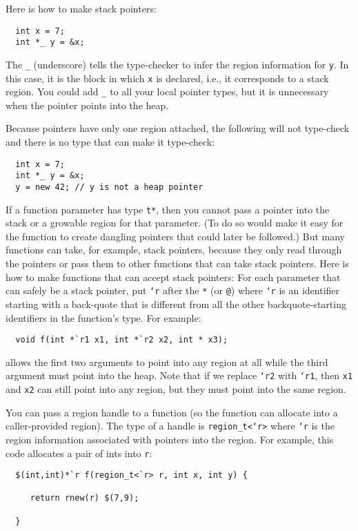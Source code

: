Here is how to make stack pointers:

\begin{verbatim}
  int x = 7;
  int *_ y = &x;
\end{verbatim}

The \texttt{_} (underscore) tells the type-checker to infer the region
information for \texttt{y}.  In this case, it is the block in which
\texttt{x} is declared, i.e., it corresponds to a stack region.  You
could add \texttt{_} to all your local pointer types, but it is
unnecessary when the pointer points into the heap.

Because pointers have only one region attached, the following will not
type-check and there is no type that can make it type-check:
\begin{verbatim}
  int x = 7;
  int *_ y = &x;
  y = new 42; // y is not a heap pointer
\end{verbatim}

If a function parameter has type \texttt{t*}, then you cannot pass a
pointer into the stack or a growable region for that parameter.  (To
do so would make it easy for the function to create dangling pointers
that could later be followed.)  But many functions can take, for
example, stack pointers, because they only read through the pointers
or pass them to other functions that can take stack pointers.  Here is
how to make functions that can accept stack pointers: For each
parameter that can safely be a stack pointer, put \texttt{`r} after the
\texttt{*} (or \texttt{@}) where \texttt{`r} is an identifier starting with
a back-quote that is different from all the other backquote-starting
identifiers in the function's type.  For example:
\begin{verbatim}
  void f(int *`r1 x1, int *`r2 x2, int * x3);
\end{verbatim}
allows the first two arguments to point into any region at all while
the third argument must point into the heap.  Note that if we replace
\texttt{`r2} with \texttt{`r1}, then \texttt{x1} and \texttt{x2} can still
point into any region, but they must point into the same region.

You can pass a region handle to a function (so the function can
allocate into a caller-provided region).  The type of a handle is
\texttt{region_t<`r>} where \texttt{`r} is the region information
associated with pointers into the region.  For example, this code
allocates a pair of ints into \texttt{r}:
\begin{verbatim}
  $(int,int)*`r f(region_t<`r> r, int x, int y) { 

     return rnew(r) $(7,9); 

  }
\end{verbatim}

